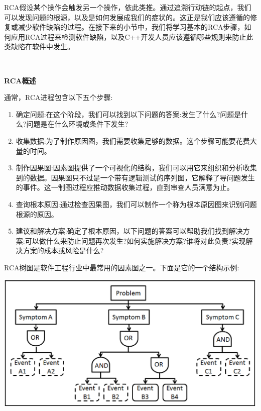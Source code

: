 RCA假设某个操作会触发另一个操作，依此类推。通过追溯行动链的起点，我们可以发现问题的根源，以及是如何发展成我们的症状的。这正是我们应该遵循的修复或减少软件缺陷的过程。在接下来的小节中，我们将学习基本的RCA步骤，如何应用RCA过程来检测软件缺陷，以及C++开发人员应该遵循哪些规则来防止此类缺陷在软件中发生。 \par

\noindent\textbf{}\ \par
\textbf{RCA概述} \ \par
通常，RCA进程包含以下五个步骤: \par

\begin{enumerate}
	\item 确定问题:在这个阶段，我们可以找到以下问题的答案:发生了什么?问题是什么?问题是在什么环境或条件下发生?
	\item 收集数据:为了制作原因图，我们需要收集足够的数据。这个步骤可能要花费大量的时间。
	\item 制作因果图:因素图提供了一个可视化的结构，我们可以用它来组织和分析收集到的数据。因果图只不过是一个带有逻辑测试的序列图，它解释了导问题发生的事件。这一制图过程应推动数据收集过程，直到审查人员满意为止。
	\item 查询根本原因:通过检查因果图，我们可以制作一个称为根本原因图来识别问题根源的原因。
	\item 建议和解决方案:确定了根本原因，以下问题的答案可以帮助我们找到解决方案:可以做什么来防止问题再次发生?如何实施解决方案?谁将对此负责?实现解决方案的成本或风险是什么?
\end{enumerate}

RCA树图是软件工程行业中最常用的因素图之一。下面是它的一个结构示例: \par

\begin{center}
	\includegraphics[width=1.0\textwidth]{content/Section-2/Chapter-13/1}
\end{center}

